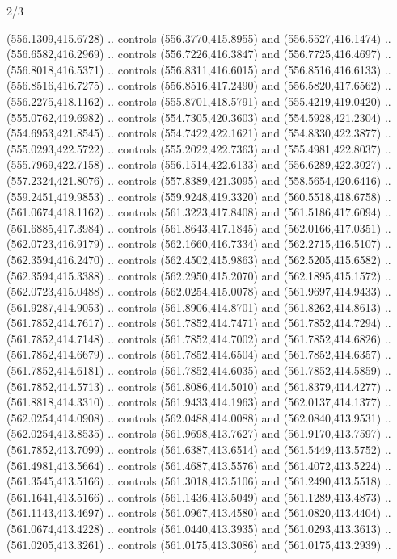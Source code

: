 \begin{flagdescription}{2/3}
\begin{scope}[xshift=0.5\flaglength,yshift=0.5\flagwidth,scale=\flagwidth/495.65]
\begin{scope}[y=0.8pt, x=0.8pt, yscale=-1,shift={(-463.76,-309.78)}]
  (556.1309,415.6728) .. controls (556.3770,415.8955) and (556.5527,416.1474) ..
  (556.6582,416.2969) .. controls (556.7226,416.3847) and (556.7725,416.4697) ..
  (556.8018,416.5371) .. controls (556.8311,416.6015) and (556.8516,416.6133) ..
  (556.8516,416.7275) .. controls (556.8516,417.2490) and (556.5820,417.6562) ..
  (556.2275,418.1162) .. controls (555.8701,418.5791) and (555.4219,419.0420) ..
  (555.0762,419.6982) .. controls (554.7305,420.3603) and (554.5928,421.2304) ..
  (554.6953,421.8545) .. controls (554.7422,422.1621) and (554.8330,422.3877) ..
  (555.0293,422.5722) .. controls (555.2022,422.7363) and (555.4981,422.8037) ..
  (555.7969,422.7158) .. controls (556.1514,422.6133) and (556.6289,422.3027) ..
  (557.2324,421.8076) .. controls (557.8389,421.3095) and (558.5654,420.6416) ..
  (559.2451,419.9853) .. controls (559.9248,419.3320) and (560.5518,418.6758) ..
  (561.0674,418.1162) .. controls (561.3223,417.8408) and (561.5186,417.6094) ..
  (561.6885,417.3984) .. controls (561.8643,417.1845) and (562.0166,417.0351) ..
  (562.0723,416.9179) .. controls (562.1660,416.7334) and (562.2715,416.5107) ..
  (562.3594,416.2470) .. controls (562.4502,415.9863) and (562.5205,415.6582) ..
  (562.3594,415.3388) .. controls (562.2950,415.2070) and (562.1895,415.1572) ..
  (562.0723,415.0488) .. controls (562.0254,415.0078) and (561.9697,414.9433) ..
  (561.9287,414.9053) .. controls (561.8906,414.8701) and (561.8262,414.8613) ..
  (561.7852,414.7617) .. controls (561.7852,414.7471) and (561.7852,414.7294) ..
  (561.7852,414.7148) .. controls (561.7852,414.7002) and (561.7852,414.6826) ..
  (561.7852,414.6679) .. controls (561.7852,414.6504) and (561.7852,414.6357) ..
  (561.7852,414.6181) .. controls (561.7852,414.6035) and (561.7852,414.5859) ..
  (561.7852,414.5713) .. controls (561.8086,414.5010) and (561.8379,414.4277) ..
  (561.8818,414.3310) .. controls (561.9433,414.1963) and (562.0137,414.1377) ..
  (562.0254,414.0908) .. controls (562.0488,414.0088) and (562.0840,413.9531) ..
  (562.0254,413.8535) .. controls (561.9698,413.7627) and (561.9170,413.7597) ..
  (561.7852,413.7099) .. controls (561.6387,413.6514) and (561.5449,413.5752) ..
  (561.4981,413.5664) .. controls (561.4687,413.5576) and (561.4072,413.5224) ..
  (561.3545,413.5166) .. controls (561.3018,413.5106) and (561.2490,413.5518) ..
  (561.1641,413.5166) .. controls (561.1436,413.5049) and (561.1289,413.4873) ..
  (561.1143,413.4697) .. controls (561.0967,413.4580) and (561.0820,413.4404) ..
  (561.0674,413.4228) .. controls (561.0440,413.3935) and (561.0293,413.3613) ..
  (561.0205,413.3261) .. controls (561.0175,413.3086) and (561.0175,413.2939) ..

\end{scope}
\end{scope}
\end{flagdescription}
